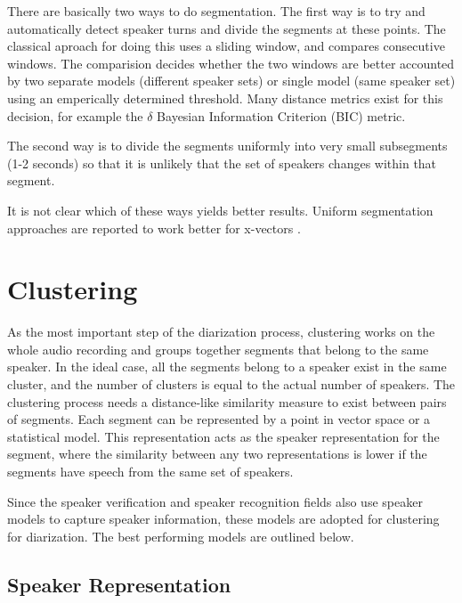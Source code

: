There are basically two ways to do segmentation. The first way is to try and automatically detect speaker turns and divide the segments at these points. The classical aproach for doing this uses a sliding window, and compares consecutive windows.	The comparision decides whether the two windows are better accounted by two separate models (different speaker sets) or single model (same speaker set) using an emperically determined threshold. Many distance metrics exist for this decision, for example the $\delta$ Bayesian Information Criterion (BIC) metric.

The second way is to divide the segments uniformly into very small subsegments (1-2 seconds) so that it is unlikely that the set of speakers changes within that segment.

It is not clear which of these ways yields better results. Uniform segmentation approaches are reported to work better for x-vectors \cite{patino2018odessa}.

\section{Clustering}
	As the most important step of the diarization process, clustering works on the whole audio recording and groups together segments that belong to the same speaker. In the ideal case, all the segments belong to a speaker exist in the same cluster, and the number of clusters is equal to the actual number of speakers. The clustering process needs a distance-like similarity measure to exist between pairs of segments. Each segment can be represented by a point in vector space or a statistical model. This representation acts as the speaker representation for the segment, where the similarity between any two representations is lower if the segments have speech from the same set of speakers.
	
	Since the speaker verification and speaker recognition fields also use speaker models to capture speaker information, these models are adopted for clustering for diarization. The best performing models are outlined below.
	
	\subsection{Speaker Representation}
